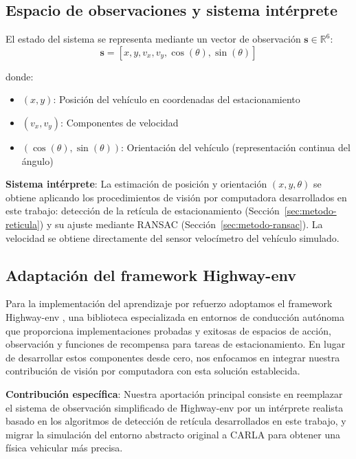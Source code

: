\subsection{Espacio de observaciones y sistema intérprete}\label{subsec:rl-observations}

El estado del sistema se representa mediante un vector de observación $\mathbf{s} \in \mathbb{R}^6$:
\begin{equation}
    \mathbf{s} = [x, y, v_x, v_y, \cos(\theta), \sin(\theta)]
\end{equation}

donde:
\begin{itemize}
    \item $(x, y)$: Posición del vehículo en coordenadas del estacionamiento
    \item $(v_x, v_y)$: Componentes de velocidad
    \item $(\cos(\theta), \sin(\theta))$: Orientación del vehículo (representación continua del ángulo)
\end{itemize}


\textbf{Sistema intérprete}: La estimación de posición y orientación $(x, y, \theta)$ se obtiene
aplicando los procedimientos de visión por computadora desarrollados en este trabajo:
detección de la retícula de estacionamiento (Sección~\ref{sec:metodo-reticula}) y
su ajuste mediante RANSAC (Sección~\ref{sec:metodo-ransac}). La velocidad se obtiene
directamente del sensor velocímetro del vehículo simulado.

\subsection{Adaptación del framework Highway-env}\label{subsec:rl-highway-adaptation}

Para la implementación del aprendizaje por refuerzo adoptamos el framework Highway-env \cite{highway-env},
una biblioteca especializada en entornos de conducción autónoma que proporciona implementaciones
probadas y exitosas de espacios de acción, observación y funciones de recompensa para tareas
de estacionamiento. En lugar de desarrollar estos componentes desde cero, nos enfocamos en
integrar nuestra contribución de visión por computadora con esta solución establecida.


\textbf{Contribución específica}: Nuestra aportación principal consiste en reemplazar el
sistema de observación simplificado de Highway-env por un intérprete realista basado en
los algoritmos de detección de retícula desarrollados en este trabajo, y migrar la
simulación del entorno abstracto original a CARLA para obtener una física vehicular
más precisa.


